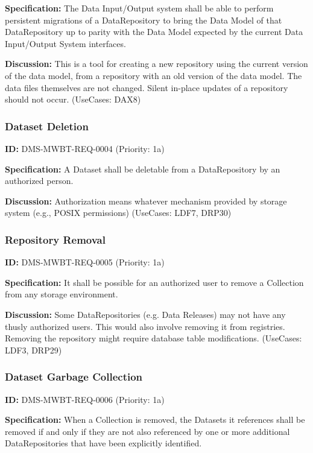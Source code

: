 \documentclass[SE,toc,lsstdraft]{lsstdoc}
\begin{document}
\textbf{Specification:}
The Data Input/Output system shall be able to perform persistent migrations of a DataRepository to bring the Data Model of that DataRepository up to parity with the Data Model expected by the current Data Input/Output System interfaces.

\textbf{Discussion:}
This is a tool for creating a new repository using the current version of the data model, from a repository with an old version of the data model. The data files themselves are not changed. Silent in-place updates of a repository should not occur. (UseCases: DAX8)

\subsubsection{Dataset Deletion}

\label{DMS-MWBT-REQ-0004}
\textbf{ID:} DMS-MWBT-REQ-0004 (Priority: 1a)

\textbf{Specification:}
A Dataset shall be deletable from a DataRepository by an authorized person.

\textbf{Discussion:}
Authorization means whatever mechanism provided by storage system (e.g., POSIX permissions) (UseCases: LDF7, DRP30)

\subsubsection{Repository Removal}

\label{DMS-MWBT-REQ-0005}
\textbf{ID:} DMS-MWBT-REQ-0005 (Priority: 1a)

\textbf{Specification:}
It shall be possible for an authorized user to remove a Collection from any storage environment.

\textbf{Discussion:}
Some DataRepositories (e.g. Data Releases) may not have any thusly authorized users. This would also involve removing it from registries. Removing the repository might require database table modifications. (UseCases: LDF3, DRP29)

\subsubsection{Dataset Garbage Collection}

\label{DMS-MWBT-REQ-0006}
\textbf{ID:} DMS-MWBT-REQ-0006 (Priority: 1a)

\textbf{Specification:}
When a Collection is removed, the Datasets it references shall be removed if and only if they are not also referenced by one or more additional DataRepositories that have been explicitly identified.
\end{document}
